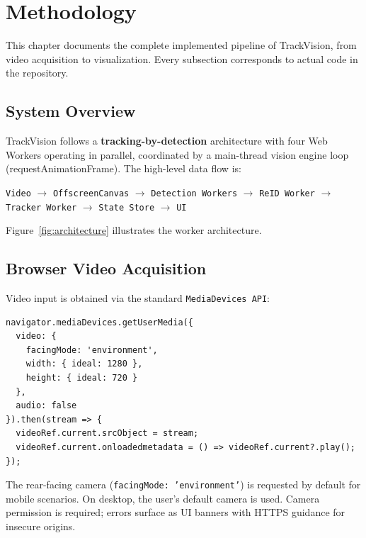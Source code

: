 \chapter{Methodology}
\label{ch:methodology}

This chapter documents the complete implemented pipeline of TrackVision, from video acquisition to visualization. Every subsection corresponds to actual code in the repository.

\section{System Overview}
\label{sec:sys-overview}

TrackVision follows a \textbf{tracking-by-detection} architecture with four Web Workers operating in parallel, coordinated by a main-thread vision engine loop (requestAnimationFrame). The high-level data flow is:

\begin{center}
\texttt{Video} $\to$ \texttt{OffscreenCanvas} $\to$ \texttt{Detection Workers} $\to$ \texttt{ReID Worker} $\to$ \texttt{Tracker Worker} $\to$ \texttt{State Store} $\to$ \texttt{UI}
\end{center}

Figure~\ref{fig:architecture} illustrates the worker architecture.

\section{Browser Video Acquisition}
\label{sec:video-acq}

Video input is obtained via the standard \texttt{MediaDevices API}:

\begin{lstlisting}[style=typescript, caption={Camera request in CameraHUD.tsx}]
navigator.mediaDevices.getUserMedia({
  video: { 
    facingMode: 'environment', 
    width: { ideal: 1280 }, 
    height: { ideal: 720 } 
  },
  audio: false
}).then(stream => {
  videoRef.current.srcObject = stream;
  videoRef.current.onloadedmetadata = () => videoRef.current?.play();
});
\end{lstlisting}

The rear-facing camera (\texttt{facingMode: 'environment'}) is requested by default for mobile scenarios. On desktop, the user's default camera is used. Camera permission is required; errors surface as UI banners with HTTPS guidance for insecure origins.

